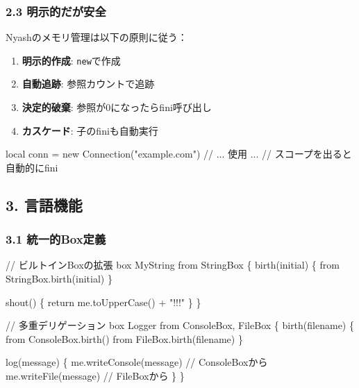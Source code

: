 \documentclass[
]{article}
\newenvironment{Shaded}{}{}
\newcommand{\NormalTok}[1]{#1}
\providecommand{\tightlist}{%
  \setlength{\itemsep}{0pt}\setlength{\parskip}{0pt}}
\begin{document}
\hypertarget{ux660eux793aux7684ux3060ux304cux5b89ux5168}{%
\subsubsection{2.3
明示的だが安全}\label{ux660eux793aux7684ux3060ux304cux5b89ux5168}}

Nyashのメモリ管理は以下の原則に従う：

\begin{enumerate}
\def\labelenumi{\arabic{enumi}.}
\tightlist
\item
  \textbf{明示的作成}: \texttt{new}で作成
\item
  \textbf{自動追跡}: 参照カウントで追跡
\item
  \textbf{決定的破棄}: 参照が0になったらfini呼び出し
\item
  \textbf{カスケード}: 子のfiniも自動実行
\end{enumerate}

\begin{Shaded}
\begin{Highlighting}[]
\NormalTok{local conn = new Connection("example.com")}
\NormalTok{// ... 使用 ...}
\NormalTok{// スコープを出ると自動的にfini}
\end{Highlighting}
\end{Shaded}

\hypertarget{ux8a00ux8a9eux6a5fux80fd}{%
\subsection{3. 言語機能}\label{ux8a00ux8a9eux6a5fux80fd}}

\hypertarget{ux7d71ux4e00ux7684boxux5b9aux7fa9}{%
\subsubsection{3.1
統一的Box定義}\label{ux7d71ux4e00ux7684boxux5b9aux7fa9}}

\begin{Shaded}
\begin{Highlighting}[]
\NormalTok{// ビルトインBoxの拡張}
\NormalTok{box MyString from StringBox \{}
\NormalTok{    birth(initial) \{}
\NormalTok{        from StringBox.birth(initial)}
\NormalTok{    \}}
    
\NormalTok{    shout() \{}
\NormalTok{        return me.toUpperCase() + "!!!"}
\NormalTok{    \}}
\NormalTok{\}}

\NormalTok{// 多重デリゲーション}
\NormalTok{box Logger from ConsoleBox, FileBox \{}
\NormalTok{    birth(filename) \{}
\NormalTok{        from ConsoleBox.birth()}
\NormalTok{        from FileBox.birth(filename)}
\NormalTok{    \}}
    
\NormalTok{    log(message) \{}
\NormalTok{        me.writeConsole(message)  // ConsoleBoxから}
\NormalTok{        me.writeFile(message)     // FileBoxから}
\NormalTok{    \}}
\NormalTok{\}}
\end{Highlighting}
\end{Shaded}
\end{document}
